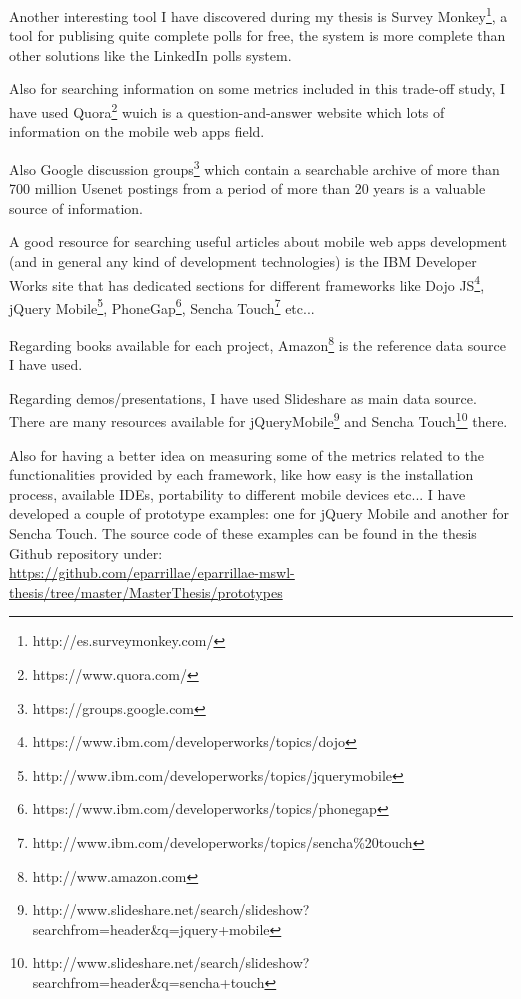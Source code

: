 \documentclass[a4paper,12pt]{book}
\begin{document}
Another interesting tool I have discovered during my thesis is Survey Monkey\footnote{http://es.surveymonkey.com/}, a tool for publising quite complete polls for free, the system is more complete than other solutions like the LinkedIn polls system.

Also for searching information on some metrics included in this trade-off study, I have used Quora\footnote{https://www.quora.com/}  wuich is a question-and-answer website which lots of information on the mobile web apps field.

Also Google discussion groups\footnote{https://groups.google.com} which contain a searchable archive of more than 700 million Usenet postings from a period of more than 20 years is a valuable source of information.

A good resource for searching useful articles about mobile web apps development (and in general any kind of development technologies) is the IBM Developer Works site that has dedicated sections for different frameworks like Dojo JS\footnote{https://www.ibm.com/developerworks/topics/dojo}, jQuery Mobile\footnote{http://www.ibm.com/developerworks/topics/jquerymobile}, PhoneGap\footnote{https://www.ibm.com/developerworks/topics/phonegap}, Sencha Touch\footnote{http://www.ibm.com/developerworks/topics/sencha\%20touch}  etc...	 

Regarding books available for each project, Amazon\footnote{http://www.amazon.com} is the reference data source I have used.

Regarding demos/presentations, I have used Slideshare as main data source. There are many resources available for jQueryMobile\footnote{http://www.slideshare.net/search/slideshow?searchfrom=header\&q=jquery+mobile}  and Sencha Touch\footnote{http://www.slideshare.net/search/slideshow?searchfrom=header\&q=sencha+touch}  there.

Also for having a better idea on measuring some of the metrics related to the functionalities provided by each framework, like how easy is the installation process, available IDEs, portability to different mobile devices etc... I have developed a couple of prototype examples: one for jQuery Mobile and another for Sencha Touch. The source code of these examples can be found in the thesis Github repository under:\\

\url{https://github.com/eparrillae/eparrillae-mswl-thesis/tree/master/MasterThesis/prototypes}

\end{document}
